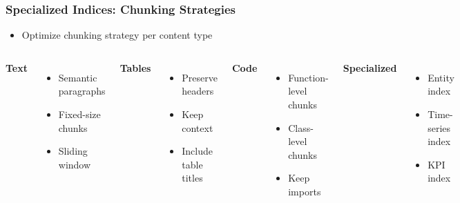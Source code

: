 \begin{frame}
    \frametitle{Specialized Indices: Chunking Strategies}
    \begin{itemize}
        \item Optimize chunking strategy per content type
    \end{itemize}
    
    \begin{columns}
        \textbf{Text}
        \begin{itemize}
            \item Semantic paragraphs
            \item Fixed-size chunks
            \item Sliding window
        \end{itemize}
        
        \textbf{Tables}
        \begin{itemize}
            \item Preserve headers
            \item Keep context
            \item Include table titles
        \end{itemize}
        
        \textbf{Code}
        \begin{itemize}
            \item Function-level chunks
            \item Class-level chunks
            \item Keep imports
        \end{itemize}
        
        \textbf{Specialized}
        \begin{itemize}
            \item Entity index
            \item Time-series index
            \item KPI index
        \end{itemize}
    \end{columns}
\end{frame}

